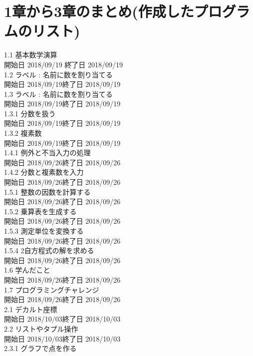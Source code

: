 \documentclass[12pt,a4paper]{jsarticle}
\begin{document}
\section*{1章から3章のまとめ(作成したプログラムのリスト)}
\begin{tabbing}
1.1 基本数学演算\\
\hspace{5.5mm}\=開始日 2018/09/19 \hspace{2.5mm}\=終了日 2018/09/19\\
1.2 ラベル : 名前に数を割り当てる\\
\>開始日 2018/09/19\>終了日 2018/09/19\\
1.3 ラベル : 名前に数を割り当てる\\
\>開始日 2018/09/19\>終了日 2018/09/19\\
1.3.1 分数を扱う\\
\>開始日 2018/09/19\>終了日 2018/09/19\\
1.3.2 複素数\\
\>開始日 2018/09/19\>終了日 2018/09/19\\
1.4.1 例外と不当入力の処理\\
\>開始日 2018/09/26\>終了日 2018/09/26\\
1.4.2 分数と複素数を入力\\
\>開始日 2018/09/26\>終了日 2018/09/26\\
1.5.1 整数の因数を計算する\\
\>開始日 2018/09/26\>終了日 2018/09/26\\
1.5.2 乗算表を生成する\\
\>開始日 2018/09/26\>終了日 2018/09/26\\
1.5.3 測定単位を変換する\\
\>開始日 2018/09/26\>終了日 2018/09/26\\
1.5.4 2自方程式の解を求める\\
\>開始日 2018/09/26\>終了日 2018/09/26\\
1.6   学んだこと\\
\>開始日 2018/09/26\>終了日 2018/09/26\\
1.7   プログラミングチャレンジ\\
\>開始日 2018/09/26\>終了日 2018/09/26\\
2.1 デカルト座標\\
\>開始日 2018/10/03\>終了日 2018/10/03\\
2.2 リストやタプル操作\\
\>開始日 2018/10/03\>終了日 2018/10/03\\
2.3.1 グラフで点を作る\\

\end{tabbing}
\end{document}

